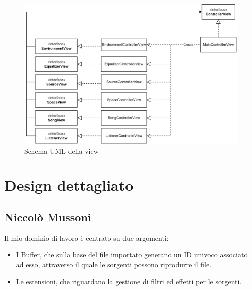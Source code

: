 \documentclass[a4paper,12pt]{report}
\begin{document}
\begin{figure}[H]
\centering{}
\includegraphics[width=\textwidth]{img/architecture/view.png}
\caption{Schema UML della view}
\label{img:analysis}
\end{figure}

\section{Design dettagliato}
\subsection*{Niccolò Mussoni}
Il mio dominio di lavoro è centrato su due argomenti:
\begin{itemize}
	\item I Buffer, che sulla base del file importato generano un ID univoco associato ad esso, attraverso il quale le sorgenti possono riprodurre il file. 
	\item Le estensioni, che riguardano la gestione di filtri ed effetti per le sorgenti.
\end{itemize}
%
\end{document}
